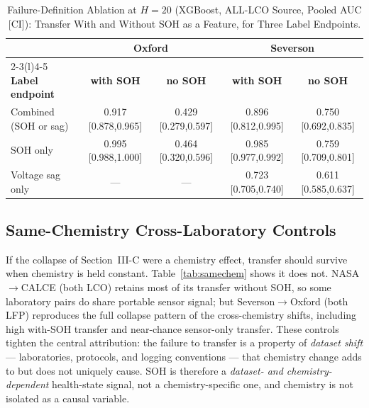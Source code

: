 \documentclass[11pt,a4paper]{article}
\begin{document}
\begin{table}[!t]
\caption{Failure-Definition Ablation at $H{=}20$ (XGBoost, ALL-LCO Source, Pooled AUC [CI]): Transfer With and Without SOH as a Feature, for Three Label Endpoints.}
\label{tab:faildef}
\centering
\footnotesize
\begin{tabular}{lcccc}
\toprule
 & \multicolumn{2}{c}{\textbf{Oxford}} & \multicolumn{2}{c}{\textbf{Severson}}\\
\cmidrule(lr){2-3}\cmidrule(l){4-5}
\textbf{Label endpoint} & \textbf{with SOH} & \textbf{no SOH} & \textbf{with SOH} & \textbf{no SOH}\\
\midrule
Combined (SOH or sag) & 0.917 [0.878,0.965] & 0.429 [0.279,0.597] & 0.896 [0.812,0.995] & 0.750 [0.692,0.835] \\
SOH only & 0.995 [0.988,1.000] & 0.464 [0.320,0.596] & 0.985 [0.977,0.992] & 0.759 [0.709,0.801] \\
Voltage sag only & --- & --- & 0.723 [0.705,0.740] & 0.611 [0.585,0.637] \\
\bottomrule
\end{tabular}
\end{table}

\subsection{Same-Chemistry Cross-Laboratory Controls}
If the collapse of Section~III-C were a chemistry effect, transfer should survive when chemistry is held constant. Table~\ref{tab:samechem} shows it does not. NASA$\to$CALCE (both LCO) retains most of its transfer without SOH, so some laboratory pairs do share portable sensor signal; but Severson$\to$Oxford (both LFP) reproduces the full collapse pattern of the cross-chemistry shifts, including high with-SOH transfer and near-chance sensor-only transfer. These controls tighten the central attribution: the failure to transfer is a property of \emph{dataset shift} --- laboratories, protocols, and logging conventions --- that chemistry change adds to but does not uniquely cause. SOH is therefore a \emph{dataset- and chemistry-dependent} health-state signal, not a chemistry-specific one, and chemistry is not isolated as a causal variable.
\end{document}

